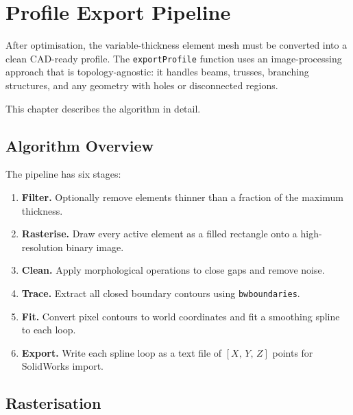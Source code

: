 \chapter{Profile Export Pipeline}
\label{ch:export}

After optimisation, the variable-thickness element mesh must be converted
into a clean CAD-ready profile.  The \texttt{exportProfile} function uses an
image-processing approach that is topology-agnostic: it handles beams,
trusses, branching structures, and any geometry with holes or disconnected
regions.

This chapter describes the algorithm in detail.

\section{Algorithm Overview}
\label{sec:export:overview}

The pipeline has six stages:

\begin{enumerate}
    \item \textbf{Filter.}  Optionally remove elements thinner than a
          fraction of the maximum thickness.
    \item \textbf{Rasterise.}  Draw every active element as a filled
          rectangle onto a high-resolution binary image.
    \item \textbf{Clean.}  Apply morphological operations to close gaps
          and remove noise.
    \item \textbf{Trace.}  Extract all closed boundary contours using
          \texttt{bwboundaries}.
    \item \textbf{Fit.}  Convert pixel contours to world coordinates and
          fit a smoothing spline to each loop.
    \item \textbf{Export.}  Write each spline loop as a text file of
          $[X,\,Y,\,Z]$ points for SolidWorks import.
\end{enumerate}

\section{Rasterisation}
\label{sec:export:raster}

